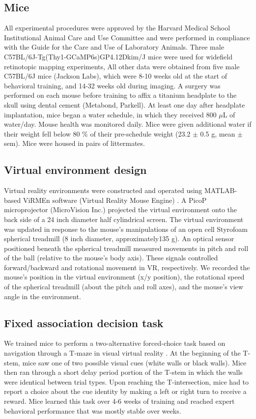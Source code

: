 \subsection{Mice}
All experimental procedures were approved by the Harvard Medical School Institutional Animal Care and Use Committee and were performed in compliance with the Guide for the Care and Use of Laboratory Animals. Three male C57BL/6J-Tg(Thy1-GCaMP6s)GP4.12Dkim/J mice were used for widefield retinotopic mapping experiments, All other data were obtained from five male C57BL/6J mice (Jackson Labs), which were 8-10 weeks old at the start of behavioral training, and 14-32 weeks old during imaging. A surgery was performed on each mouse before training to affix a titanium headplate to the skull using dental cement (Metabond, Parkell). At least one day after headplate implantation, mice began a water schedule, in which they received 800 $\mu$L of water/day. Mouse health was monitored daily. Mice were given additional water if their weight fell below 80 $\%$ of their pre-schedule weight (23.2 $\pm$ 0.5 g, mean $\pm$ sem). Mice were housed in pairs of littermates.

\subsection{Virtual environment design}
Virtual reality environments were constructed and operated using MATLAB-based ViRMEn software (Virtual Reality Mouse Engine) \citep{Aronov2014, Harvey2009}. A PicoP microprojector (MicroVision Inc.) projected the virtual environment onto the back side of a 24 inch diameter half cylindrical screen. The virtual environment was updated in response to the mouse's manipulations of an open cell Styrofoam spherical treadmill (8 inch diameter, approximately135 g). An optical sensor positioned beneath the spherical treadmill measured movements in pitch and roll of the ball (relative to the mouse's body axis). These signals controlled forward/backward and rotational movement in VR, respectively. We recorded the mouse's position in the virtual environment (x/y position), the rotational speed of the spherical treadmill (about the pitch and roll axes), and the mouse's view angle in the environment. 

\subsection{Fixed association decision task}
We trained mice to perform a two-alternative forced-choice task based on navigation through a T-maze in visual virtual reality \citep{Harvey:2012du}. At the beginning of the T-stem, mice saw one of two possible visual cues (white walls or black walls). Mice then ran through a short delay period portion of the T-stem in which the walls were identical between trial types. Upon reaching the T-intersection, mice had to report a choice about the cue identity by making a left or right turn to receive a reward. Mice learned this task over 4-6 weeks of training and reached expert behavioral performance that was mostly stable over weeks.

